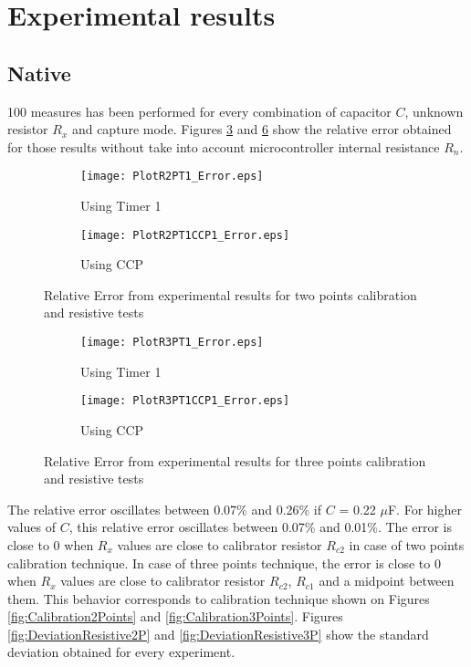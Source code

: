 \section{Experimental results}\label{S:Res:Results}
\subsection{Native}\label{S:Res:Results:Native}
100 measures has been performed for every combination of capacitor $C$, unknown resistor $R_{x}$ and capture mode. Figures \ref{fig:RelativeErrorResistive2P} and \ref{fig:RelativeErrorResistive3P} show the relative error obtained for those results without take into account microcontroller internal resistance $R_{n}$.

\begin{figure}[H]
\centering
	\begin{subfigure}{0.75\textwidth}
	\texttt{[image: PlotR2PT1\_Error.eps]}
	\caption{Using Timer 1}
	\label{fig:PlotR2PT1Error}
	\end{subfigure}
	\begin{subfigure}{0.75\textwidth}
	\texttt{[image: PlotR2PT1CCP1\_Error.eps]}
	\caption{Using CCP}
	\label{fig:PlotR2PT1CCP1Error}
	\end{subfigure}
\caption{Relative Error from experimental results for two points calibration and resistive tests}
\label{fig:RelativeErrorResistive2P}
\end{figure}

\begin{figure}[H]
\centering
    \begin{subfigure}{0.75\textwidth}
	\texttt{[image: PlotR3PT1\_Error.eps]}
	\caption{Using Timer 1}
	\label{fig:PlotR3PT1Error}
	\end{subfigure}
	\begin{subfigure}{0.75\textwidth}
	\texttt{[image: PlotR3PT1CCP1\_Error.eps]}
	\caption{Using CCP}
	\label{fig:PlotR3PT1CCP1Error}
	\end{subfigure}
\caption{Relative Error from experimental results for three points calibration and resistive tests}
\label{fig:RelativeErrorResistive3P}
\end{figure}

The relative error oscillates between 0.07\% and 0.26\% if $C$ = 0.22 $\mu$F. For higher values of $C$, this relative error oscillates between 0.07\% and 0.01\%. The error is close to 0 when $R_{x}$ values are close to calibrator resistor $R_{c2}$ in case of two points calibration technique. In case of three points technique, the error is close to 0 when $R_{x}$ values are close to calibrator resistor $R_{c2}$, $R_{c1}$ and a midpoint between them. This behavior corresponds to calibration technique shown on Figures \ref{fig:Calibration2Points} and \ref{fig:Calibration3Points}. Figures \ref{fig:DeviationResistive2P} and \ref{fig:DeviationResistive3P} show the standard deviation obtained for every experiment.
\medskip

